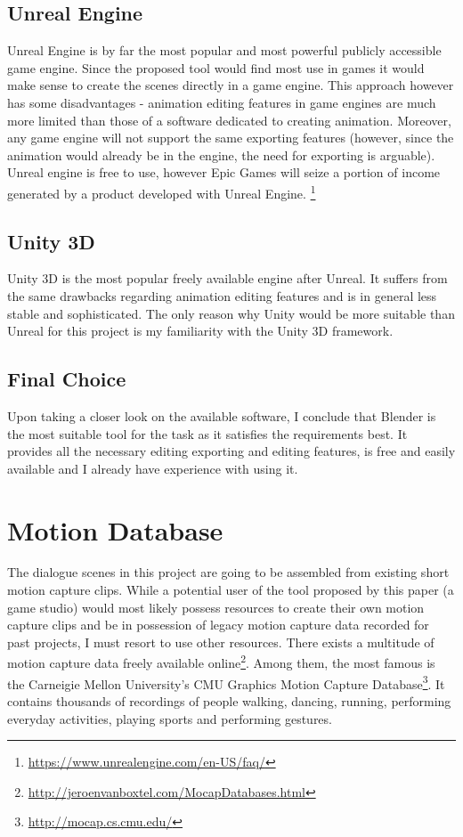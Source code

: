 \subsection{Unreal Engine}

Unreal Engine is by far the most popular and most powerful publicly accessible game engine. Since the proposed tool would find most use in games it would make sense to create the scenes directly in a game engine. This approach however has some disadvantages - animation editing features in game engines are much more limited than those of a software dedicated to creating animation. Moreover, any game engine will not support the same exporting features (however, since the animation would already be in the engine, the need for exporting is arguable). Unreal engine is free to use, however Epic Games will seize a portion of income generated by a product developed with Unreal Engine. \footnote{\url{https://www.unrealengine.com/en-US/faq/}}

\subsection{Unity 3D}

Unity 3D is the most popular freely available engine after Unreal. It suffers from the same drawbacks regarding animation editing features and is in general less stable and sophisticated. The only reason why Unity would be more suitable than Unreal for this project is my familiarity with the Unity 3D framework.


\subsection{Final Choice}

Upon taking a closer look on the available software, I conclude that Blender is the most suitable tool for the task as it satisfies the requirements best. It provides all the necessary editing exporting and editing features, is free and easily available and I already have experience with using it.



\section{Motion Database}

The dialogue scenes in this project are going to be assembled from existing short motion capture clips. While a potential user of the tool proposed by this paper (a game studio) would most likely possess resources to create their own motion capture clips and be in possession of legacy motion capture data recorded for past projects, I must resort to use other resources. There exists a multitude of motion capture data freely available online\footnote{\url{http://jeroenvanboxtel.com/MocapDatabases.html}}. Among them, the most famous is the Carneigie Mellon University's CMU Graphics Motion Capture Database\footnote{\url{http://mocap.cs.cmu.edu/}}. It contains thousands of recordings of people walking, dancing, running, performing everyday activities, playing sports and performing gestures.


